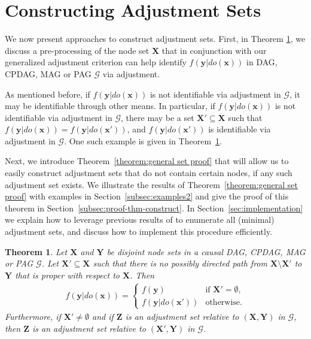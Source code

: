 \documentclass[11pt,a4paper]{article}
\newtheorem{theorem}[definition]{Theorem}
\newcommand{\g}[1][G]{\mathcal{#1}}
\begin{document}
\section{Constructing Adjustment Sets} \label{subsec:constructive set gac}

We now present approaches to construct adjustment sets.
First, in Theorem \ref{thm:preprocessing}, we discuss a pre-processing of the node set $\mathbf{X}$ that in conjunction with our generalized adjustment criterion can help identify $f(\mathbf{y}|do(\mathbf{x}))$ in DAG, CPDAG, MAG or PAG $\g$ via adjustment.

As mentioned before, if $f(\mathbf{y}|do(\mathbf{x}))$ is not identifiable via adjustment in $\g$, it may be identifiable through other means. In particular, if $f(\mathbf{y}|do(\mathbf{x}))$ is not identifiable via adjustment in $\g$, there may be a set $\mathbf{X'} \subseteq \mathbf{X}$ such that $f(\mathbf{y}|do(\mathbf{x})) = f(\mathbf{y}| do(\mathbf{x'}))$, and $f(\mathbf{y}| do(\mathbf{x'}))$ is identifiable via adjustment in $\g$. One such example is given in Theorem~\ref{thm:preprocessing}. 

Next, we introduce Theorem~\ref{theorem:general set proof} that will allow us to easily construct adjustment sets that do not contain certain nodes, if any such adjustment set exists. We illustrate the results of Theorem~\ref{theorem:general set proof} with examples in Section~\ref{subsec:examples2} and give the proof of this theorem in Section~\ref{subsec:proof-thm-construct}.  In Section~\ref{sec:implementation} we explain how to leverage previous results of \cite{vanconstructing} to enumerate all (minimal) adjustment sets, and discuss how to implement this procedure efficiently.

\begin{theorem} \label{thm:preprocessing}
Let $\mathbf{X}$ and $\mathbf{Y}$ be disjoint node sets in a causal DAG, CPDAG, MAG or PAG $\g$. Let $\mathbf{X'} \subseteq \mathbf{X}$ such that there is no possibly directed path from $\mathbf{X} \setminus \mathbf{X'}$ to $\mathbf{Y}$ that is proper with respect to $\mathbf{X}$. 
Then 
\begin{align*}
f(\mathbf{y}|do(\mathbf{x})) = \begin{cases}
   f(\mathbf{y}) & \text{if }\mathbf{X'} = \emptyset,\\ f(\mathbf{y}|do(\mathbf{x'})) & \text{otherwise.} \end{cases}
   \end{align*} 
  Furthermore, if $\mathbf{X'} \neq \emptyset$ and if $\mathbf{Z}$ is an adjustment set relative to $(\mathbf{X,Y})$ in $\g$, then $\mathbf{Z}$ is an adjustment set relative to  $(\mathbf{X',Y})$ in $\g$.
\end{theorem}
\end{document}
